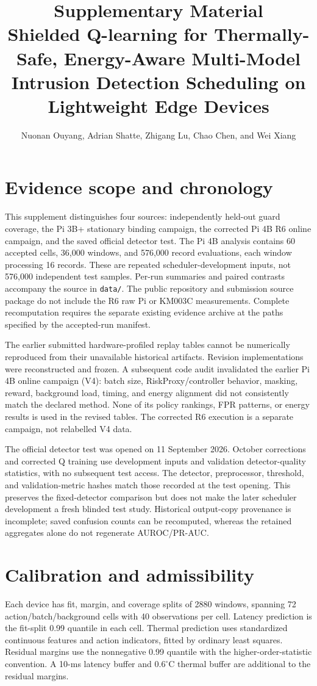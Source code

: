\documentclass[journal]{IEEEtran}
\title{Supplementary Material\\Shielded Q-learning for Thermally-Safe, Energy-Aware Multi-Model Intrusion Detection Scheduling on Lightweight Edge Devices}
\author{Nuonan Ouyang, Adrian Shatte, Zhigang Lu, Chao Chen, and Wei Xiang}
\begin{document}
\maketitle
\section{Evidence scope and chronology}
This supplement distinguishes four sources: independently held-out guard coverage, the Pi 3B+ stationary binding campaign, the corrected Pi 4B R6 online campaign, and the saved official detector test. The Pi 4B analysis contains 60 accepted cells, 36,000 windows, and 576,000 record evaluations, each window processing 16 records. These are repeated scheduler-development inputs, not 576,000 independent test samples. Per-run summaries and paired contrasts accompany the source in \texttt{data/}. The public repository and submission source package do not include the R6 raw Pi or KM003C measurements. Complete recomputation requires the separate existing evidence archive at the paths specified by the accepted-run manifest.

The earlier submitted hardware-profiled replay tables cannot be numerically reproduced from their unavailable historical artifacts. Revision implementations were reconstructed and frozen. A subsequent code audit invalidated the earlier Pi 4B online campaign (V4): batch size, RiskProxy/controller behavior, masking, reward, background load, timing, and energy alignment did not consistently match the declared method. None of its policy rankings, FPR patterns, or energy results is used in the revised tables. The corrected R6 execution is a separate campaign, not relabelled V4 data.

The official detector test was opened on 11 September 2026. October corrections and corrected Q training use development inputs and validation detector-quality statistics, with no subsequent test access. The detector, preprocessor, threshold, and validation-metric hashes match those recorded at the test opening. This preserves the fixed-detector comparison but does not make the later scheduler development a fresh blinded test study. Historical output-copy provenance is incomplete; saved confusion counts can be recomputed, whereas the retained aggregates alone do not regenerate AUROC/PR-AUC.

\section{Calibration and admissibility}
Each device has fit, margin, and coverage splits of 2880 windows, spanning 72 action/batch/background cells with 40 observations per cell. Latency prediction is the fit-split 0.99 quantile in each cell. Thermal prediction uses standardized continuous features and action indicators, fitted by ordinary least squares. Residual margins use the nonnegative 0.99 quantile with the higher-order-statistic convention. A 10-ms latency buffer and $0.6^\circ$C thermal buffer are additional to the residual margins.
\end{document}
